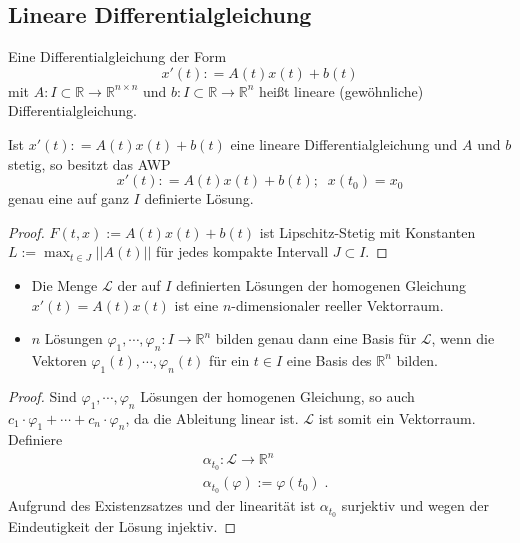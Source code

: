 \begin{Lemma}[Gronwall]
\end{Lemma}


\begin{Satz}[Eindeutigkeitssatz]
\end{Satz}


\subsection{Lineare Differentialgleichung}

\begin{Definition}
Eine Differentialgleichung der Form
$$ x' (t): = A(t) x(t) + b(t)$$
mit $A: I \subset \mathbb{R} \to \mathbb{R}^{n \times n}$ und $b: I \subset \mathbb{R} \to \mathbb{R}^{n}$ heißt lineare (gewöhnliche) Differentialgleichung.
\end{Definition}

\begin{Satz}
Ist $ x' (t): = A(t) x(t) + b(t)$ eine lineare Differentialgleichung und $A$ und $b$ stetig, so besitzt das AWP 
$$ x' (t): = A(t) x(t) + b(t) ; \; \; x(t_0) = x_0 $$
genau eine auf ganz $I$ definierte Lösung.
\end{Satz}

\begin{proof}
$F(t,x):= A(t) x(t) + b(t)$ ist Lipschitz-Stetig mit Konstanten $L:= \max_{t \in J}|| A(t) ||$ für jedes kompakte Intervall $J \subset I$.
\end{proof}

\begin{Satz}
\label{LHL}
\hfill
\begin{itemize}
\item Die Menge $\mathcal{L}$ der auf $I$ definierten Lösungen der homogenen Gleichung $x'(t) = A(t)x(t)$ ist eine $n$-dimensionaler reeller Vektorraum.
\item $n$ Lösungen $\varphi_1, \cdots, \varphi_n : I \to \mathbb{R}^n$ bilden genau dann eine Basis für $\mathcal{L}$, wenn die Vektoren $\varphi_1(t), \cdots, \varphi_n(t)$ für ein $t \in I$ eine Basis des $\mathbb{R}^n$ bilden.
\end{itemize}
\end{Satz}
\begin{proof}
Sind  $\varphi_1, \cdots, \varphi_n$ Lösungen der homogenen Gleichung, so auch $ c_1 \cdot \varphi_1 + \cdots + c_n \cdot \varphi_n$, da die Ableitung linear ist.
$\mathcal{L}$ ist somit ein Vektorraum. Definiere 
\begin{align*}
& \alpha_{t_0} : \mathcal{L} \to \mathbb{R}^n \\
& \alpha_{t_0} (\varphi) := \varphi(t_0) \; .
\end{align*} 
Aufgrund des Existenzsatzes und der linearität ist $ \alpha_{t_0}$ surjektiv und wegen der Eindeutigkeit der Lösung injektiv.
\end{proof}

